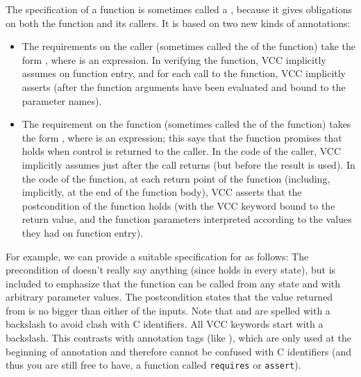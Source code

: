 The specification of a function is sometimes called a ,
because it gives obligations on both the function and its callers. It
is based on two new kinds of annotations:
\begin{itemize}
\item The requirements on the caller (sometimes called the
   of the function) take the form 
  , 
  where  is an expression.
  In verifying the function, VCC implicitly assumes
   on function entry, and for each call to the function, VCC
  implicitly asserts  (after the function arguments have been
  evaluated and bound to the parameter names).

\item The requirement on the function  (sometimes called the
   of the function) takes the form
  , where  is an expression; this says that
  the function promises that  holds when control is returned to
  the caller.  In the code of the caller, VCC implicitly assumes 
  just after the call returns (but
  before the result is used). In the code of the function, at each return
  point of the function (including, implicitly,
  at the end of the function body), VCC asserts that the postcondition
  of the function holds (with the VCC keyword \vcc{\result} bound to the
  return value, and the function parameters 
  interpreted according to the values they had on function entry).
\end{itemize}

For example, we can provide a suitable specification for  as
follows:
\noindent
The precondition  of  doesn't
really say anything (since \vcc{\true} holds in every state), but is included
to emphasize that the function can be called from any state and
with arbitrary parameter values.
The postcondition states that the value returned from  
is no bigger than either of the inputs.
Note that \vcc{\true} and \vcc{\result} are spelled with a backslash
to avoid clash with C identifiers.
All VCC keywords start with a backslash.
This contrasts with annotation tags (like ),
which are only used at the beginning of annotation
and therefore cannot be confused with C identifiers
(and thus you are still free to have, \eg
a function called \lstinline{requires} or \lstinline{assert}).

